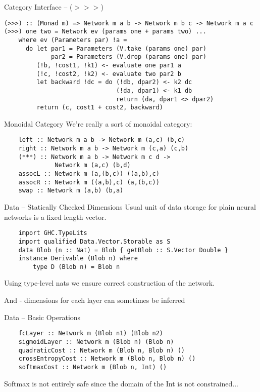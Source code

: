 \documentclass[10pt]{beamer}
\newenvironment{xframe}[1][]{\begin{frame}[fragile,environment=xframe,#1]}{\end{frame}}
\begin{document}
\begin{xframe}{Category Interface -- ($>>>$)}
  \begin{verbatim}
(>>>) :: (Monad m) => Network m a b -> Network m b c -> Network m a c
(>>>) one two = Network ev (params one + params two) ...
    where ev (Parameters par) !a =
      do let par1 = Parameters (V.take (params one) par)
             par2 = Parameters (V.drop (params one) par)
         (!b, !cost1, !k1) <- evaluate one par1 a
         (!c, !cost2, !k2) <- evaluate two par2 b
         let backward !dc = do (!db, dpar2) <- k2 dc
                               (!da, dpar1) <- k1 db
                               return (da, dpar1 <> dpar2)
         return (c, cost1 + cost2, backward)
  \end{verbatim}
\end{xframe}

\begin{xframe}{Monoidal Category}
  We're really a sort of monoidal category:

  \begin{verbatim}
    left :: Network m a b -> Network m (a,c) (b,c)
    right :: Network m a b -> Network m (c,a) (c,b)
    (***) :: Network m a b -> Network m c d ->
              Network m (a,c) (b,d)
    assocL :: Network m (a,(b,c)) ((a,b),c)
    assocR :: Network m ((a,b),c) (a,(b,c))
    swap :: Network m (a,b) (b,a)
  \end{verbatim}

\end{xframe}

\begin{xframe}{Data -- Statically Checked Dimensions}
  Usual unit of data storage for plain neural networks is a fixed length vector.

  \begin{verbatim}
    import GHC.TypeLits
    import qualified Data.Vector.Storable as S
    data Blob (n :: Nat) = Blob { getBlob :: S.Vector Double }
    instance Derivable (Blob n) where
        type D (Blob n) = Blob n
  \end{verbatim}

  Using type-level nats we ensure correct construction of the network.

  And - dimensions for each layer can sometimes be inferred
\end{xframe}

\begin{xframe}{Data -- Basic Operations}
  \begin{verbatim}
    fcLayer :: Network m (Blob n1) (Blob n2)
    sigmoidLayer :: Network m (Blob n) (Blob n)
    quadraticCost :: Network m (Blob n, Blob n) ()
    crossEntropyCost :: Network m (Blob n, Blob n) ()
    softmaxCost :: Network m (Blob n, Int) ()
  \end{verbatim}

  Softmax is not entirely safe since the domain of the Int is not constrained...
\end{xframe}
\end{document}
